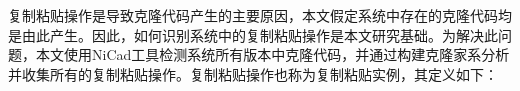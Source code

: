 


复制粘贴操作是导致克隆代码产生的主要原因，本文假定系统中存在的克隆代码均是由此产生。因此，如何识别系统中的复制粘贴操作是本文研究基础。为解决此问题，本文使用NiCad工具检测系统所有版本中克隆代码，并通过构建克隆家系分析并收集所有的复制粘贴操作。复制粘贴操作也称为复制粘贴实例，其定义如下：


